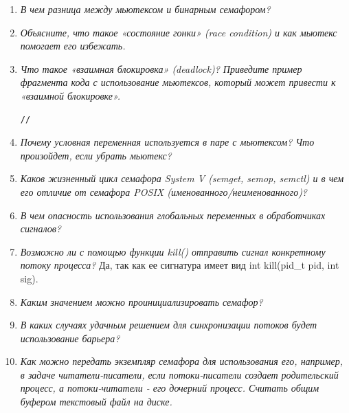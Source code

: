 \begin{enumerate}
	\item \textit{В чем разница между мьютексом и бинарным семафором?}\newline 
	
	\item \textit{Объясните, что такое «состояние гонки» (race condition) и как мьютекс помогает его избежать.}\newline 
	
	\item \textit{Что такое «взаимная блокировка» (deadlock)? Приведите пример фрагмента кода с использование мьютексов, который может привести к «взаимной блокировке».}\newline 
	
	\begin{lstlisting}[style=cstyle]
	//
	\end{lstlisting}
	\item \textit{Почему условная переменная используется в паре с мьютексом? Что произойдет, если убрать мьютекс?}\newline 
	
	\item \textit{Каков жизненный цикл семафора System V (semget, semop, semctl) и в чем его отличие от семафора POSIX (именованного/неименованного)?}\newline 
	
	\item \textit{В чем опасность использования глобальных переменных в обработчиках сигналов?}\newline 
	
	\item \textit{Возможно ли с помощью функции kill() отправить сигнал конкретному	потоку процесса?}\newline 
	Да, так как ее сигнатура имеет вид int kill(pid\_t pid, int sig).
	\item \textit{Каким значением можно проинициализировать семафор?}\newline 
	
	\item \textit{В каких случаях удачным решением для синхронизации потоков будет использование барьера?}\newline 
	
	\item \textit{Как можно передать экземпляр семафора для использования его, например, в задаче читатели-писатели, если потоки-писатели создает родительский процесс, а потоки-читатели - его дочерний процесс. Считать общим буфером текстовый файл на диске.}\newline 
	
\end{enumerate}

